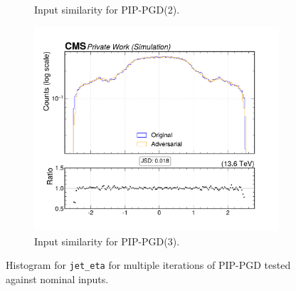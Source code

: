 \begin{figure}[htbp]
\begin{subfigure}[t]{0.32\textwidth}
    \caption*{Input similarity for PIP-PGD(2).}
  \end{subfigure}\hfill
  \begin{subfigure}[t]{0.32\textwidth}
    \includegraphics[width=\linewidth]{media/output/features/compare/combined_it_3/cmp_global_features_jet_eta.pdf}
    \caption*{Input similarity for PIP-PGD(3).}
  \end{subfigure}

  \caption*{Histogram for \texttt{jet\_eta} for multiple iterations of PIP-PGD tested against nominal inputs.}
  \label{fig:combined_input_jet_eta}
\end{figure}

